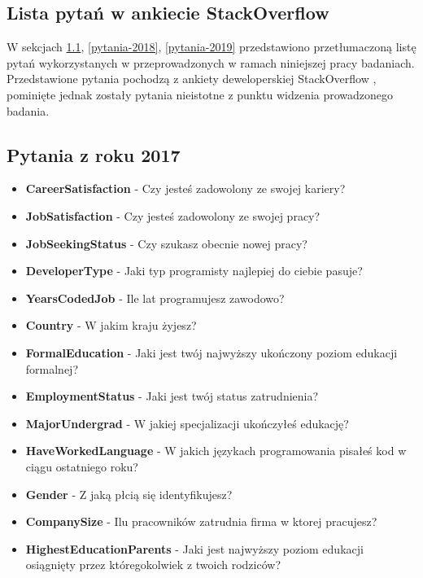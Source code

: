 
\appendix
\begin{appendices}
    \chapter{Lista pytań w ankiecie StackOverflow}\label{app:dod1}

    W sekcjach \ref{pytania-2017}, \ref{pytania-2018}, \ref{pytania-2019} przedstawiono przetłumaczoną listę pytań wykorzystanych w przeprowadzonych w ramach niniejszej pracy badaniach.
    Przedstawione pytania pochodzą z ankiety deweloperskiej StackOverflow \cite{so-survey-info}, pominięte jednak zostały pytania nieistotne z punktu widzenia prowadzonego badania.

    \section{Pytania z roku 2017}\label{pytania-2017}
    \begin{itemize}
        \item \textbf{CareerSatisfaction} - Czy jesteś zadowolony ze swojej kariery?
        \item \textbf{JobSatisfaction} - Czy jesteś zadowolony ze swojej pracy?
        \item \textbf{JobSeekingStatus} - Czy szukasz obecnie nowej pracy?
        \item \textbf{DeveloperType} - Jaki typ programisty najlepiej do ciebie pasuje?
        \item \textbf{YearsCodedJob} - Ile lat programujesz zawodowo?
        \item \textbf{Country} - W jakim kraju żyjesz?
        \item \textbf{FormalEducation} - Jaki jest twój najwyższy ukończony poziom edukacji formalnej?
        \item \textbf{EmploymentStatus} - Jaki jest twój status zatrudnienia?
        \item \textbf{MajorUndergrad} - W jakiej specjalizacji ukończyłeś edukację?
        \item \textbf{HaveWorkedLanguage} - W jakich językach programowania pisałeś kod w ciągu ostatniego roku?
        \item \textbf{Gender} - Z jaką płcią się identyfikujesz?
        \item \textbf{CompanySize} - Ilu pracowników zatrudnia firma w ktorej pracujesz?
        \item \textbf{HighestEducationParents} - Jaki jest najwyższy poziom edukacji osiągnięty przez któregokolwiek z twoich rodziców?

\end{itemize}
\end{appendices}
